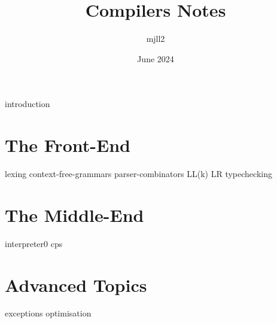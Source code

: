 \documentclass[12pt,a4paper,twoside,openany, chapterprefix=on]{scrbook}
\title{Compilers Notes}
\author{mjll2}
\date{June 2024}
\begin{document}
\maketitle

\frontmatter
{
\hypersetup{linkcolor=black, linkbordercolor=white}
\tableofcontents
}

\mainmatter

{introduction}

\part{The Front-End}
{lexing}
{context-free-grammars}
{parser-combinators}
{LL(k)}
{LR}
{typechecking}

\part{The Middle-End}
{interpreter0}
{cps}

\part{Advanced Topics}
{exceptions}
{optimisation}


\end{document}
